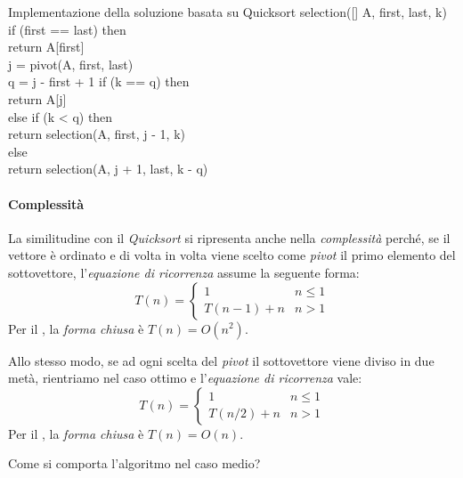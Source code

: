 \begin{minicode}{Implementazione della soluzione basata su Quicksort}
\ind{} selection([] A,  first,  last,  k)\\
    \indf if (first == last) then\\
        return A[first]\\

    \indf{} j = pivot(A, first, last)\\
    \indf{} q = j - first + 1\hfill{}
    \indf if (k == q) then\\
        return A[j]\\
    \indf else if (k < q) then\\
        return selection(A, first, j - 1, k)\\
    \indf else\\
        return selection(A, j + 1, last, k - q)
\end{minicode}

\paragraph{Complessità}
La similitudine con il \emph{Quicksort} si ripresenta anche nella
\emph{complessità} perché, se il vettore è ordinato e di volta in volta
viene scelto come \emph{pivot} il primo elemento del sottovettore,
l'\emph{equazione di ricorrenza} assume la seguente forma:
\[T(n)=\begin{cases}
    1 & n\leq 1\\
    T(n-1)+n & n>1
\end{cases}\]
Per il \emph{}, la \emph{forma chiusa} è $T(n)=O(n^2)$.

Allo stesso modo, se ad ogni scelta del \emph{pivot} il sottovettore viene
diviso in due metà, rientriamo nel caso ottimo e l'\emph{equazione di ricorrenza}
vale:
\[T(n)=\begin{cases}
    1 & n\leq 1\\
    T(n/2)+n & n>1
\end{cases}\]
Per il \emph{}, la \emph{forma chiusa} è $T(n)=O(n)$.

\bigskip\noindent
Come si comporta l'algoritmo nel caso medio?


